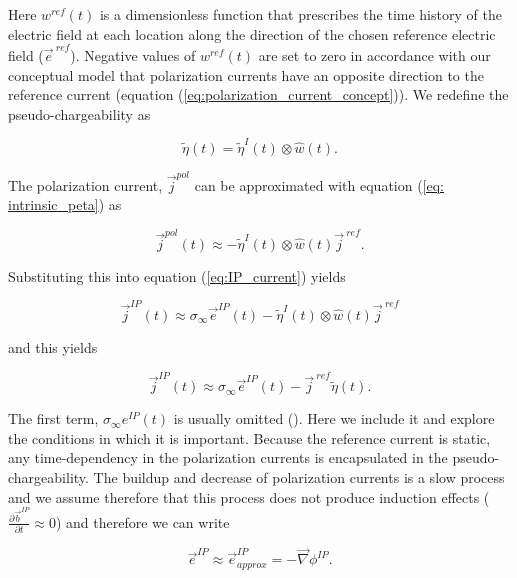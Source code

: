 \documentclass[extra,mreferee]{gji}
\newcommand{\grad}{\vec \nabla}
\newcommand{\siginf}{\sigma_\infty}
\renewcommand {\j}  { {\vec j} }
\renewcommand {\b}  { {\vec b} }
\newcommand {\e}  { {\vec e} }
\newcommand{\peta}{\tilde{\eta}}
\newcommand{\eref}{\e^{\ ref}}
\newcommand{\jref}{\j^{\ ref}}
\begin{document}
Here $w^{ref}(t)$ is a dimensionless function that prescribes the time history of the electric field at each location along the direction of the chosen reference electric field ($\eref$).  Negative values of  $w^{ref}(t)$ are set to zero in accordance with our conceptual model that polarization currents have an opposite direction to the reference current (equation (\ref{eq:polarization_current_concept})).
We redefine the pseudo-chargeability as
\begin{linenomath*}
\begin{equation}
    \peta(t) = \peta^{I}(t)\otimes \hat{w}(t).
    \label{eq: pseudochargeability}
\end{equation}
\end{linenomath*}
The polarization current, $\j^{pol}$ can be approximated with equation (\ref{eq: intrinsic_peta}) as
\begin{linenomath*}
\begin{equation}
  \j^{pol}(t) \approx - \peta^{I}(t)\otimes \hat{w}(t)\jref.
\end{equation}
\end{linenomath*}
Substituting this into equation (\ref{eq:IP_current}) yields
\begin{linenomath*}
\begin{equation}
  \j^{IP}(t) \approx \siginf\e^{IP}(t) - \peta^{I}(t)\otimes \hat{w}(t)\jref
\end{equation}
\end{linenomath*}
and this yields
\begin{linenomath*}
\begin{equation}
  \j^{IP}(t) \approx \siginf\e^{IP}(t) -\jref\peta(t).
  \label{eq: jip_EMIP}
\end{equation}
\end{linenomath*}

The first term, $\siginf e^{IP}(t)$ is usually omitted (\cite{Smith1988a}). Here we include it and explore the conditions in which it is important. 
Because the reference current is static, any time-dependency in the polarization currents is encapsulated in the pseudo-chargeability. The buildup and decrease of polarization currents is a slow process and we assume therefore that this process does not produce induction effects ($\frac{\partial \b^{IP}}{\partial t} \approx 0$) and therefore we can write 
\begin{linenomath*}
\begin{equation}
  \e^{IP} \approx  \e^{IP}_{approx} = -\grad\phi^{IP}.
  \label{eq: eip_approx}
\end{equation}
\end{linenomath*}
\end{document}
